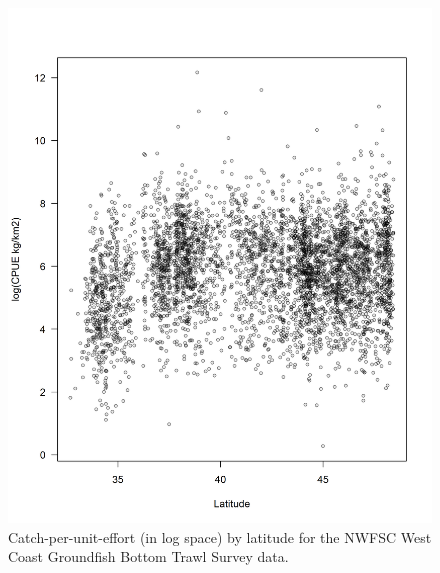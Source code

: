 \documentclass[12pt,]{article}
\begin{document}
\begin{figure}
\centering
\includegraphics{Figures/NWFSC_CPUE_Lat.png}
\caption{Catch-per-unit-effort (in log space) by latitude for the NWFSC
West Coast Groundfish Bottom Trawl Survey data. \label{fig:nw_cpue_lat}}
\end{figure}

\FloatBarrier
\end{document}
